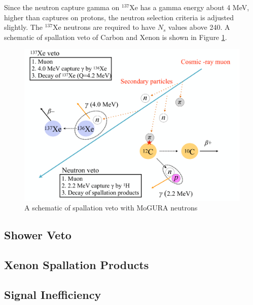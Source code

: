 Since the neutron capture gamma on $^{137}$Xe has a gamma energy about 4 MeV, higher than captures on protons, the neutron selection criteria is adjusted slightly. The $^{137}$Xe neutrons are required to have $N_s$ values above 240. A schematic of spallation veto of Carbon and Xenon is shown in Figure \ref{fig:spall_veto}.
\begin{figure}[htb]
	\centering
	\includegraphics[scale=0.35]{spall_veto.png}
	\caption{A schematic of spallation veto with MoGURA neutrons}
	\label{fig:spall_veto}
\end{figure}

\subsection{Shower Veto}


\subsection{Xenon Spallation Products}
\subsection{Signal Inefficiency}

